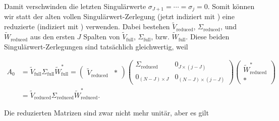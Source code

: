 Damit verschwinden die letzten Singulärwerte $\sigma_{J+1} = \cdots = \sigma_j = 0$.
Somit können wir statt der alten vollen Singulärwert-Zerlegung (jetzt indiziert mit ) eine reduzierte (indiziert mit ) verwenden.
Dabei bestehen $\tilde V_\mathrm{reduced}$, $\Sigma_\mathrm{reduced}$, und $\tilde W_\mathrm{reduced}$ aus den ersten $J$ Spalten von $\tilde V_\mathrm{full}$, $\Sigma_\mathrm{full}$, bzw. $\tilde W_\mathrm{full}$.
Diese beiden Singulärwert-Zerlegungen sind tatsächlich gleichwertig, weil

\begin{align*}
    A_0
    &=
    \tilde V_\mathrm{full} \Sigma_\mathrm{full} \tilde W_\mathrm{full}^\ast
    =
    \begin{pmatrix}
        \tilde V_\mathrm{reduced} & \ast
    \end{pmatrix}
    \begin{pmatrix}
        \Sigma_\mathrm{reduced} & 0_{J \times (j - J)}       \\
        0_{(N - J) \times J}    & 0_{(N - J) \times (j - J)}
    \end{pmatrix}
    \begin{pmatrix}
        \tilde W_\mathrm{reduced}^\ast \\ \ast
    \end{pmatrix} \\
    &=
    \tilde V_\mathrm{reduced} \Sigma_\mathrm{reduced} \tilde W_\mathrm{reduced}^\ast.
\end{align*}

Die reduzierten Matrizen sind zwar nicht mehr unitär, aber es gilt

